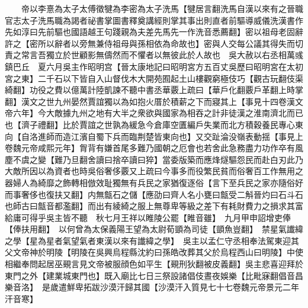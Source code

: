 　　帝以李憙為太子太傅徵犍為李密為太子洗馬【犍居言翻洗馬自漢以來有之晉職官志太子洗馬職為謁者祕書掌圖書釋奠講經則掌其事出則直者前驅導威儀洗漢書作先如淳曰先前驅也國語越王句踐親為夫差先馬先一作洗音悉薦翻】密以祖母老固辭許之【密所以辭者以旁無兼侍祖母與孫相依為命故也】密與人交每公議其得失而切責之常言吾獨立於世顧影無儔然而不懼者以無彼此於人故也　吳大赦以右丞相萬彧鎮巴丘　夏六月吳主作昭明宫【晉太康地記曰昭明宮方五百丈吳歷曰昭明宮在太初宮之東】二千石以下皆自入山督伐木大開苑囿起土山樓觀窮極伎巧【觀古玩翻伎渠綺翻】功役之費以億萬計陸凱諫不聽中書丞華覈上疏曰【華戶化翻覈戶革翻上時掌翻】漢文之世九州晏然賈誼獨以為如抱火厝於積薪之下而寢其上【事見十四卷漢文帝六年】今大敵據九州之地有大半之衆欲與國家為相吞之計非徒漢之淮南濟北而已也【濟子禮翻】比於賈誼之世孰為緩急今倉庫空匱編戶失業而北方積穀養民專心東向【自洛進師而造江濱自蜀下兵而臨荆楚皆東向也】又交趾淪没嶺表動揺【事見上卷魏元帝咸熙元年】胷背有嫌首尾多難乃國朝之厄會也若舍此急務盡力功作卒有風塵不虞之變【難乃旦翻舍讀曰捨卒讀曰猝】當委版築而應烽燧驅怨民而赴白刃此乃大敵所因以為資者也時吳俗奢侈覈又上疏曰今事多而役繁民貧而俗奢百工作無用之器婦人為綺靡之飾轉相倣效耻獨無有兵民之家猶復逐俗【言下至兵民之家亦隨俗好而事奢侈也復扶又翻】内無甔石之儲【應劭曰齊人名小甕曰甔受二斛晉灼曰石斗石也師古曰甔音都濫翻】而出有綾綺之服上無尊卑等級之差下有耗財費力之損求其富給庸可得乎吳主皆不聽　秋七月王祥以睢陵公罷【睢音雖】　九月甲申詔增吏俸【俸扶用翻】　以何曾為太保義陽王望為太尉荀顗為司徒【顗魚豈翻】　禁星氣䜟緯之學【星為星者氣望氣者東漢以來有䜟緯之學】　吳主以孟仁守丞相奉法駕東迎其父文帝神於明陵【明陵在吳興烏程縣沈約曰孫皓改葬其父於烏程西山曰明陵】中使相繼奉問起居巫覡言見文帝被服顔色如平生【覡刑狄翻被皮義翻】吳主悲喜迎拜於東門之外【建業城東門也】既入廟比七日三祭設諸倡伎晝夜娛樂【比毗寐翻倡音昌樂音洛】　是歲遣鮮卑拓跋沙漠汗歸其國【沙漠汗入質見七十七卷魏元帝景元二年汗音寒】

